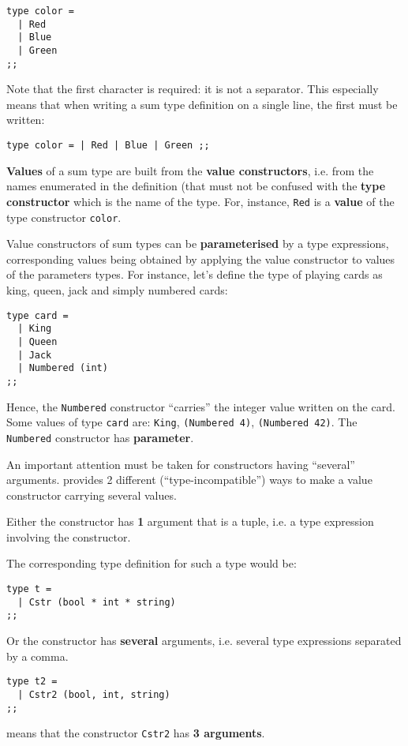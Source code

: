 {\scriptsize
\begin{lstlisting}
type color =
  | Red
  | Blue
  | Green
;;
\end{lstlisting}}

Note that the first \terminal{\vertical} character is required: it is not a
separator. This especially means that when writing a sum type
definition on a single line, the first \terminal{\vertical} must be written:

{\scriptsize
\begin{lstlisting}
type color = | Red | Blue | Green ;;
\end{lstlisting}}

{\bf Values} of a sum type  are built from the
{\bf value constructors}, i.e. from the names enumerated in the
definition (that must not be confused with the {\bf type constructor}
which is the name of the type. For, instance,
{\tt Red} is a {\bf value} of the type constructor {\tt color}.


Value constructors of sum
types can be {\bf parameterised} by a type expressions, corresponding
values being obtained by applying the value constructor to values of
the parameters types. For instance, let's define the type of playing
cards as king, queen, jack and simply numbered cards:

{\scriptsize
\begin{lstlisting}
type card =
  | King
  | Queen
  | Jack
  | Numbered (int)
;;
\end{lstlisting}}

Hence, the {\tt Numbered} constructor ``carries'' the integer value
written on the card. Some values of type {\tt card} are: {\tt King},
{\tt (Numbered 4)}, {\tt (Numbered 42)}. The {\tt Numbered}
constructor has {\bf parameter}.

\medskip
An important attention must be taken for constructors having
``several'' arguments. {\focal} provides 2 different
(``type-incompatible'') ways to make a value constructor carrying
several values.
\begin{compact-itemize}
\item Either the constructor has {\bf 1} argument that is a tuple,
  i.e. a type expression involving the {\tt *} constructor.

The corresponding type definition for such a type would be:

{\scriptsize
\begin{lstlisting}
type t =
  | Cstr (bool * int * string)
;;
\end{lstlisting}}

\item Or the constructor has {\bf several} arguments, i.e. several
  type expressions separated by a comma.

{\scriptsize
\begin{lstlisting}
type t2 =
  | Cstr2 (bool, int, string)
;;
\end{lstlisting}}

\noindent means that the constructor {\tt Cstr2} has {\bf 3 arguments}.
\end{compact-itemize}


